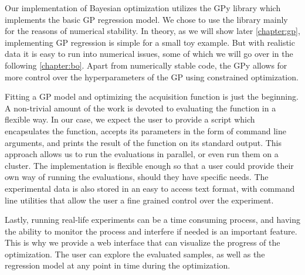 Our implementation of Bayesian optimization utilizes the GPy library \citep{gpy2014}
which implements the basic GP regression model. We chose to use the library
mainly for the reasons of numerical stability. In theory, as we will show later
\autoref{chapter:gp}, implementing GP regression is simple for a small toy example.
But with realistic data it is easy to run into numerical issues, some of which
we will go over in the following \autoref{chapter:bo}. Apart from
numerically stable code, the GPy allows for more control over the
hyperparameters of the GP using constrained optimization.

Fitting a GP model and optimizing the acquisition function is just the
beginning. A non-trivial amount of the work is devoted to evaluating the
function in a flexible way. In our case, we expect the user to provide a script
which encapsulates the function, accepts its parameters in the form of command
line arguments, and prints the result of the function on its standard output.
This approach allows us to run the evaluations in parallel, or even run them on
a cluster. The implementation is flexible enough so that a user could provide
their own way of running the evaluations, should they have specific needs.  The
experimental data is also stored in an easy to access text format, with command
line utilities that allow the user a fine grained control over the experiment.

Lastly, running real-life experiments can be a time consuming process, and
having the ability to monitor the process and interfere if needed is an
important feature. This is why we provide a web interface that can visualize
the progress of the optimization. The user can explore the evaluated samples,
as well as the regression model at any point in time during the optimization.



